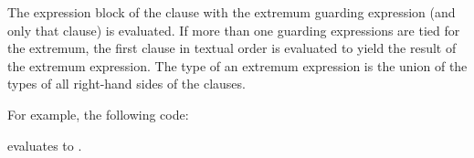 The expression block of the clause with the extremum
guarding expression (and only that clause) is evaluated.  If more than
one guarding expressions are tied for the extremum, the first
clause in textual order is evaluated to yield the result of the
extremum expression.  The type of an extremum expression is the union
of the types of all right-hand sides of the clauses.

For example, the following code:

evaluates to .
